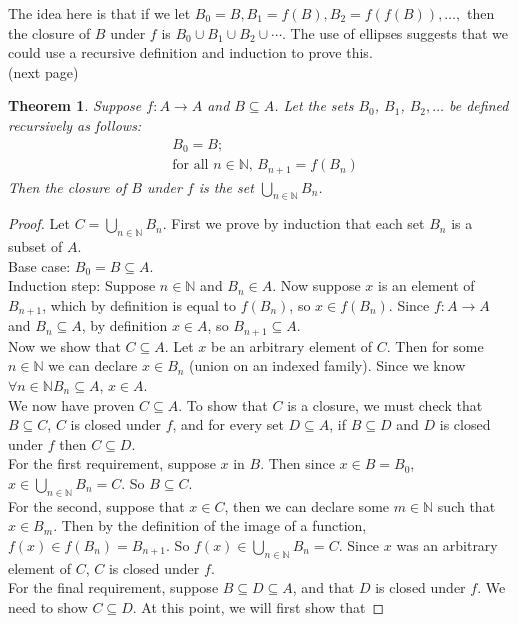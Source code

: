 \documentclass{report}
\newtheorem*{theorem}{Theorem}
\theoremstyle{definition}
\begin{document}
The idea here is that if we let $B_0=B,B_1=f(B),B_2=f(f(B)),\ldots,$ then the closure of $B$ under $f$ is $B_0\cup B_1\cup B_2\cup\cdots$. The use of ellipses suggests that we could use a recursive
definition and induction to prove this.\\
(next page)\newpage
\begin{theorem}
Suppose $f:A\to A$ and $B\subseteq A$. Let the sets $B_0$, $B_1$, $B_2,\ldots$ be defined recursively as follows:
\begin{align*}
&B_0=B;\\
&\text{for all $n\in\mathbb N$, $B_{n+1}=f(B_n)$}
\end{align*}
Then the closure of $B$ under $f$ is the set $\bigcup_{n\in\mathbb N}B_n$.
\end{theorem}
\begin{proof}
Let $C=\bigcup_{n\in\mathbb N}B_n$. First we prove by induction that each set $B_n$ is a subset of $A$.\\
\indent Base case: $B_0=B\subseteq A$.\\
\indent Induction step: Suppose $n\in\mathbb N$ and $B_n\in A$. Now suppose $x$ is an element of $B_{n+1}$, which by definition is equal to $f(B_n)$, so $x\in f(B_n)$. Since $f:A\to A$ and $B_n\subseteq A$, by definition $x\in A$, so $B_{n+1}\subseteq A$.\\
\indent Now we show that $C\subseteq A$. Let $x$ be an arbitrary element of $C$. Then for some $n\in\mathbb N$ we can declare $x\in B_n$ (union on an indexed family). Since we know $\forall n\in\mathbb N B_n\subseteq A$,
$x\in A$.\\
\indent We now have proven $C\subseteq A$. To show that $C$ is a closure, we must check that $B\subseteq C$, $C$ is closed under $f$, and for every set $D\subseteq A$, if $B\subseteq D$ and $D$ is
closed under $f$ then $C\subseteq D$.\\
\indent For the first requirement, suppose $x$ in $B$. Then since $x\in B=B_0$, $x\in\bigcup_{n\in\mathbb N}B_n=C$. So $B\subseteq C$.\\
\indent For the second, suppose that $x\in C$, then we can declare some $m\in\mathbb N$ such that $x\in B_m$. Then by the definition of the image of a function, $f(x)\in f(B_n)=B_{n+1}$. 
So $f(x)\in\bigcup_{n\in\mathbb N}B_n=C$. Since $x$ was an arbitrary element of $C$, $C$ is closed under $f$.\\
\indent For the final requirement, suppose $B\subseteq D\subseteq A$, and that $D$ is closed under $f$. We need to show $C\subseteq D$. At this point, we will first show that 

\end{proof}
\end{document}
